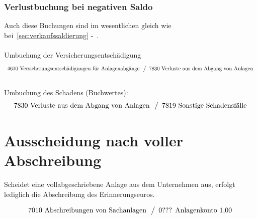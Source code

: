 \documentclass[a4paper,10pt]{report}
\begin{document}
\subsubsection{Verlustbuchung bei negativen Saldo}
Auch diese Buchungen sind im wesentlichen gleich wie
bei~\autoref{sec:verkaufssaldierung}
-~.\\
\\
Umbuchung der Versicherungsentschädigung
\begin{equation*}
  \begin{array}{l}
    \text{4610 Versicherungsentschädigungen für Anlagenabgänge}\\
  \end{array}
  \left\slash
    \begin{array}{l}
      \text{7830 Verluste aus dem Abgang von Anlagen}\\
    \end{array}
  \right.
\end{equation*}
\\
Umbuchung des Schadens (Buchwertes):
\begin{equation*}
  \begin{array}{l}
    \text{7830 Verluste aus dem Abgang von Anlagen}\\
  \end{array}
  \left\slash
    \begin{array}{l}
      \text{7819 Sonstige Schadensfälle}\\
    \end{array}
  \right.
\end{equation*}

\section{Ausscheidung nach voller Abschreibung}
Scheidet eine vollabgeschriebene Anlage aus dem Unternehmen aus,
erfolgt lediglich die Abschreibung des Erinnerungseuros.

\begin{equation*}
  \begin{array}{l}
    \text{7010 Abschreibungen von Sachanlagen}\\
  \end{array}
  \left\slash
    \begin{array}{l}
      \text{0??? Anlagenkonto 1,00}\\
    \end{array}
  \right.
\end{equation*}
\end{document}
